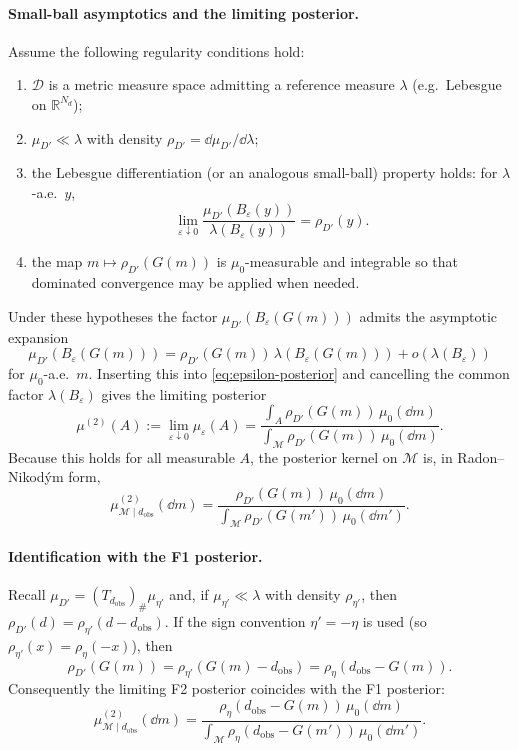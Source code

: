 \documentclass[11pt]{article}
\theoremstyle{remark}
\newcommand{\modelspace}{\mathcal{M}}
\newcommand{\dataspace}{\mathcal{D}}
\begin{document}
\paragraph{Small-ball asymptotics and the limiting posterior.}
Assume the following regularity conditions hold:
\begin{enumerate}
  \item \(\dataspace\) is a metric measure space admitting a reference measure
    \(\lambda\) (e.g.\ Lebesgue on \(\mathbb{R}^{N_d}\));
  \item \(\mu_{D'}\ll\lambda\) with density \(\rho_{D'}=\dd\mu_{D'}/\dd\lambda\);
  \item the Lebesgue differentiation (or an analogous small-ball) property holds:
    for \(\lambda\)-a.e.\ \(y\),
    \[
    \lim_{\varepsilon\downarrow 0}\frac{\mu_{D'}(B_\varepsilon(y))}{\lambda(B_\varepsilon(y))}
    = \rho_{D'}(y).
    \]
  \item the map \(m\mapsto \rho_{D'}(G(m))\) is \(\mu_0\)-measurable and
    integrable so that dominated convergence may be applied when needed.
\end{enumerate}
Under these hypotheses the factor \(\mu_{D'}(B_\varepsilon(G(m)))\) admits the
asymptotic expansion
\[
\mu_{D'}(B_\varepsilon(G(m))) = \rho_{D'}(G(m))\,\lambda(B_\varepsilon(G(m))) + o(\lambda(B_\varepsilon))
\]
for \(\mu_0\)-a.e.\ \(m\). Inserting this into
\eqref{eq:epsilon-posterior} and cancelling the common factor \(\lambda(B_\varepsilon)\)
gives the limiting posterior
\[
\mu^{(2)}(A):=\lim_{\varepsilon\downarrow 0}\mu_\varepsilon(A)
=
\frac{\int_A \rho_{D'}(G(m))\,\mu_0(\dd m)}
{\int_{\modelspace} \rho_{D'}(G(m))\,\mu_0(\dd m)}.
\]
Because this holds for all measurable \(A\), the posterior kernel on \(\modelspace\)
is, in Radon--Nikodým form,
\begin{equation}\label{eq:F2-solution}
\boxed{
\mu^{(2)}_{\modelspace\mid d_{\mathrm{obs}}}(\dd m)
=
\frac{\rho_{D'}(G(m))\,\mu_0(\dd m)}{\int_{\modelspace}\rho_{D'}(G(m'))\,\mu_0(\dd m')}.
}
\end{equation}

\paragraph{Identification with the F1 posterior.}
Recall \(\mu_{D'}=(T_{d_{\mathrm{obs}}})_\#\mu_{\eta'}\) and, if
\(\mu_{\eta'}\ll\lambda\) with density \(\rho_{\eta'}\), then
\(\rho_{D'}(d)=\rho_{\eta'}(d-d_{\mathrm{obs}})\). If the sign convention
\(\eta'=-\eta\) is used (so \(\rho_{\eta'}(x)=\rho_\eta(-x)\)), then
\[
\rho_{D'}(G(m)) = \rho_{\eta'}(G(m)-d_{\mathrm{obs}}) = \rho_\eta(d_{\mathrm{obs}}-G(m)).
\]
Consequently the limiting F2 posterior coincides with the F1 posterior:
\[
\mu^{(2)}_{\modelspace\mid d_{\mathrm{obs}}}(\dd m)
=
\frac{\rho_\eta(d_{\mathrm{obs}}-G(m))\,\mu_0(\dd m)}
{\int_{\modelspace}\rho_\eta(d_{\mathrm{obs}}-G(m'))\,\mu_0(\dd m')}.
\]
\end{document}
